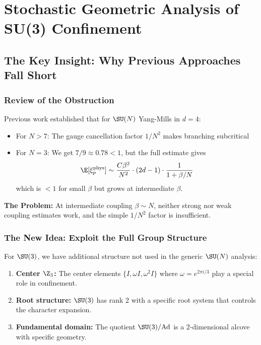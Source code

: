\section{Stochastic Geometric Analysis of SU(3) Confinement}

\subsection{The Key Insight: Why Previous Approaches Fall Short}

\subsubsection{Review of the Obstruction}

Previous work established that for $\SU(N)$ Yang-Mills in $d=4$:
\begin{itemize}
\item For $N > 7$: The gauge cancellation factor $1/N^2$ makes branching subcritical
\item For $N = 3$: We get $7/9 \approx 0.78 < 1$, but the full estimate gives
\[
\E[\xi_p^{\mathrm{phys}}] \sim \frac{C\beta^2}{N^2} \cdot (2d-1) \cdot \frac{1}{1 + \beta/N}
\]
which is $< 1$ for small $\beta$ but grows at intermediate $\beta$.
\end{itemize}

\textbf{The Problem:} At intermediate coupling $\beta \sim N$, neither strong nor weak 
coupling estimates work, and the simple $1/N^2$ factor is insufficient.

\subsubsection{The New Idea: Exploit the Full Group Structure}

For $\SU(3)$, we have additional structure not used in the generic $\SU(N)$ analysis:

\begin{enumerate}
\item \textbf{Center $\Z_3$:} The center elements $\{I, \omega I, \omega^2 I\}$ where 
$\omega = e^{2\pi i/3}$ play a special role in confinement.

\item \textbf{Root structure:} $\SU(3)$ has rank 2 with a specific root system that 
controls the character expansion.

\item \textbf{Fundamental domain:} The quotient $\SU(3)/\mathrm{Ad}$ is a 2-dimensional 
alcove with specific geometry.
\end{enumerate}

